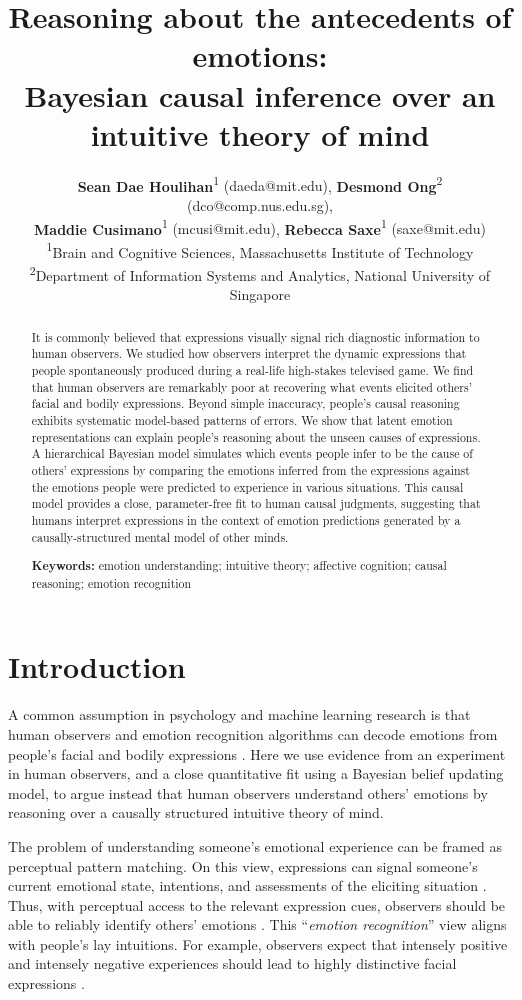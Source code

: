 \documentclass[10pt,letterpaper]{article}
\title{Reasoning about the antecedents of emotions:\\Bayesian causal inference over an intuitive theory of mind}
\author{{\large {\bf Sean Dae Houlihan}{\normalfont\textsuperscript{1} (daeda@mit.edu)}}, {\large {\bf Desmond Ong}{\normalfont\textsuperscript{2} (dco@comp.nus.edu.sg)}},\\{\large {\bf Maddie Cusimano}{\normalfont\textsuperscript{1} (mcusi@mit.edu)}}, {\large {\bf Rebecca Saxe}{\normalfont\textsuperscript{1} (saxe@mit.edu)}} \\
{\normalfont\textsuperscript{1}}Brain and Cognitive Sciences, Massachusetts Institute of Technology\\
{\normalfont\textsuperscript{2}}Department of Information Systems and Analytics, National University of Singapore
}
\begin{document}
\maketitle

\begin{abstract}

It is commonly believed that expressions visually signal rich diagnostic information to human observers. We studied how observers interpret the dynamic expressions that people spontaneously produced during a real-life high-stakes televised game. We find that human observers are remarkably poor at recovering what events elicited others' facial and bodily expressions. Beyond simple inaccuracy, people's causal reasoning exhibits systematic model-based patterns of errors. We show that latent emotion representations can explain people's reasoning about the unseen causes of expressions. A hierarchical Bayesian model simulates which events people infer to be the cause of others' expressions by comparing the emotions inferred from the expressions against the emotions people were predicted to experience in various situations. This causal model provides a close, parameter-free fit to human causal judgments, suggesting that humans interpret expressions in the context of emotion predictions generated by a causally-structured mental model of other minds.


\textbf{Keywords:} 
emotion understanding; intuitive theory; affective cognition; causal reasoning; emotion recognition
\end{abstract}


\section{Introduction}

A common assumption in psychology and machine learning research is that human observers and emotion recognition algorithms can decode emotions from people's facial and bodily expressions \citep[for review, see][]{barrett2019reconsidered}. Here we use evidence from an experiment in human observers, and a close quantitative fit using a Bayesian belief updating model, to argue instead that human observers understand others' emotions by reasoning over a causally structured intuitive theory of mind. 

The problem of understanding someone's emotional experience can be framed as perceptual pattern matching.
On this view, expressions can signal someone's current emotional state, intentions, and assessments of the eliciting situation \citep{keltner2019betadvances, shariff2011cdps}. 
Thus, with perceptual access to the relevant expression cues, observers should be able to reliably identify others' emotions \citep{cowen2020face28}. This ``{\em emotion recognition}'' view aligns with people's lay intuitions. For example, observers expect that intensely positive and intensely negative experiences should lead to highly distinctive facial expressions \citep{aviezer2012science}.
\end{document}

